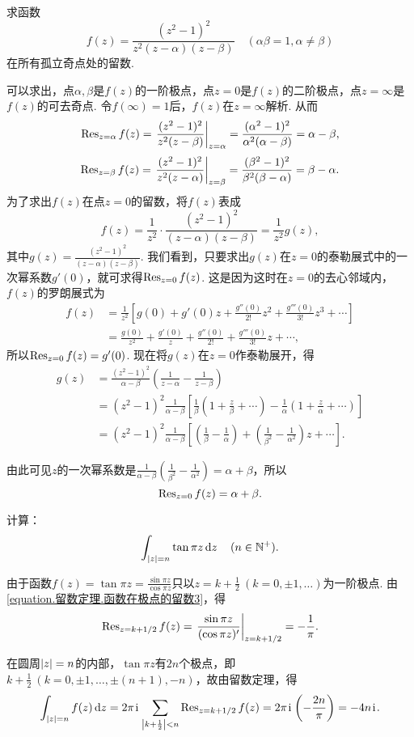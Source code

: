 \begin{example}
求函数\[
f(z) = \frac{(z^2-1)^2}{z^2(z-\alpha)(z-\beta)}
\quad(\alpha\beta=1, \alpha\neq\beta)
\]在所有孤立奇点处的留数.
\begin{solution}
可以求出，点\(\alpha,\beta\)是\(f(z)\)的一阶极点，点\(z=0\)是\(f(z)\)的二阶极点，点\(z=\infty\)是\(f(z)\)的可去奇点.
令\(f(\infty)=1\)后，\(f(z)\)在\(z=\infty\)解析.
从而\[
\Res_{z=\alpha} f(z)
= \eval{ \frac{(z^2-1)^2}{z^2(z-\beta)} }_{z=\alpha}
= \frac{(\alpha^2-1)^2}{\alpha^2(\alpha-\beta)}
= \alpha-\beta,
\]\[
\Res_{z=\beta} f(z)
= \eval{ \frac{(z^2-1)^2}{z^2(z-\alpha)} }_{z=\beta}
= \frac{(\beta^2-1)^2}{\beta^2(\beta-\alpha)}
= \beta-\alpha.
\]为了求出\(f(z)\)在点\(z=0\)的留数，将\(f(z)\)表成\[
f(z) = \frac{1}{z^2} \cdot \frac{(z^2-1)^2}{(z-\alpha)(z-\beta)}
= \frac{1}{z^2} g(z),
\]其中\(g(z) = \frac{(z^2-1)^2}{(z-\alpha)(z-\beta)}\).
我们看到，只要求出\(g(z)\)在\(z=0\)的泰勒展式中的一次幂系数\(g'(0)\)，就可求得\(\operatorname{Res}_{z=0} f(z)\).
这是因为这时在\(z=0\)的去心邻域内，\(f(z)\)的罗朗展式为\begin{align*}
f(z) &= \frac{1}{z^2} \left[ g(0) + g'(0) z + \frac{g''(0)}{2!} z^2 + \frac{g'''(0)}{3!} z^3 + \dotsb \right] \\
&= \frac{g(0)}{z^2} + \frac{g'(0)}{z} + \frac{g''(0)}{2!} + \frac{g'''(0)}{3!} z + \dotsb,
\end{align*}
所以\(\operatorname{Res}_{z=0} f(z) = g'(0)\).
现在将\(g(z)\)在\(z=0\)作泰勒展开，得\begin{align*}
g(z) &= \frac{(z^2-1)^2}{\alpha-\beta} \left(\frac{1}{z-\alpha}-\frac{1}{z-\beta}\right) \\
&= (z^2-1)^2 \frac{1}{\alpha-\beta} \left[
\frac{1}{\beta} \left(1+\frac{z}{\beta}+\dotsb\right)
- \frac{1}{\alpha} \left(1+\frac{z}{\alpha}+\dotsb\right)
\right] \\
&= (z^2-1)^2 \frac{1}{\alpha-\beta} \left[
\left(\frac{1}{\beta}-\frac{1}{\alpha}\right)
+ \left(\frac{1}{\beta^2}-\frac{1}{\alpha^2}\right) z
+ \dotsb
\right].
\end{align*}

由此可见\(z\)的一次幂系数是\(\frac{1}{\alpha-\beta} \left(\frac{1}{\beta^2}-\frac{1}{\alpha^2}\right) = \alpha+\beta\)，所以\[
\operatorname{Res}_{z=0} f(z) = \alpha+\beta.
\]
\end{solution}
\end{example}

\begin{example}
计算：\[
\int_{\abs{z}=n} \tan \pi z \dd{z}
\quad(n\in\mathbb{N}^+).
\]
\begin{solution}
由于函数\(f(z) = \tan \pi z = \frac{\sin \pi z}{\cos \pi z}\)只以\(z=k+\frac{1}{2}\ (k=0,\pm1,\dotsc)\)为一阶极点.
由\cref{equation.留数定理.函数在极点的留数3}，得\[
\Res_{z=k+1/2} f(z)
= \eval{\frac{\sin \pi z}{(\cos \pi z)'}}_{z=k+1/2}
= -\frac{1}{\pi}.
\]

在圆周\(\abs{z}=n\)的内部，\(\tan \pi z\)有\(2n\)个极点，即\(k + \frac{1}{2}\ (k=0,\pm1,\dotsc,\pm(n+1),-n)\)，故由留数定理，得\[
\int_{\abs{z}=n} f(z) \dd{z}
= 2\pi\kern1pt\mathrm{i}\kern1pt \sum_{\abs{k+\frac{1}{2}}<n} \operatorname{Res}_{z=k+1/2} f(z)
= 2\pi\kern1pt\mathrm{i}\kern1pt \left(-\frac{2n}{\pi}\right)
= -4n\kern1pt\mathrm{i}\kern1pt.
\]
\end{solution}
\end{example}

